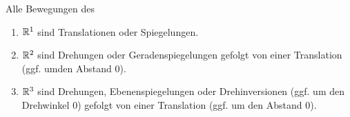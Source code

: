 \begin{theorem}
Alle Bewegungen des
\begin{enumerate}
\item $\mathbb{R}^1$ sind Translationen oder Spiegelungen.
\item $\mathbb{R}^2$ sind Drehungen oder Geradenspiegelungen gefolgt von einer Translation (ggf. umden Abstand $0$).
\item $\mathbb{R}^3$ sind Drehungen, Ebenenspiegelungen oder Drehinversionen (ggf. um den Drehwinkel $0$) gefolgt von einer Translation (ggf. um den Abstand $0$).
\end{enumerate}
\end{theorem}